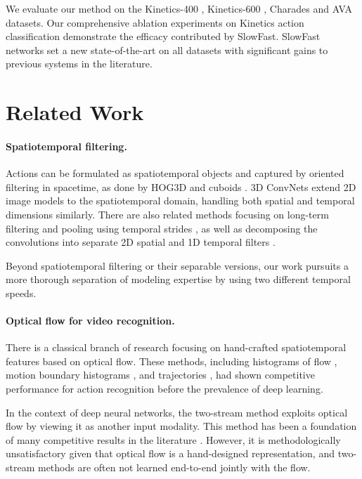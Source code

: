\documentclass[10pt,twocolumn,letterpaper]{article}
\begin{document}
	We  evaluate our method on the Kinetics-400 \cite{Kay2017}, Kinetics-600 \cite{Carreira2018}, Charades \cite{Sigurdsson2016} and AVA \cite{Gu2018} datasets. Our comprehensive ablation experiments 	on Kinetics action classification demonstrate the efficacy contributed by SlowFast.  SlowFast networks set a new state-of-the-art on all datasets with significant gains to previous systems in the literature.
	
	\section{Related Work}
	\label{sec:related_work}
	
	\paragraph{Spatiotemporal filtering.}
	Actions can be formulated as spatiotemporal objects and captured by oriented filtering in spacetime, as done by HOG3D \cite{Klaeser2008} and cuboids \cite{Dollar2005}.
	3D ConvNets \cite{Taylor2010,Tran2015,Carreira2017} extend 2D image models \cite{Krizhevsky2012,Simonyan2015,Szegedy2015,He2016} to the spatiotemporal domain, handling both spatial and temporal dimensions similarly.
	There are also related methods focusing on long-term filtering and pooling using temporal strides \cite{Varol2018,Feichtenhofer2016,Wang2016a,Zhou2017}, as well as decomposing the convolutions into separate 2D spatial and 1D temporal filters \cite{Feichtenhofer2016a,Tran2018,Xie2018,Qiu2017}.
	
	Beyond spatiotemporal filtering or their separable versions, our work pursuits a more thorough separation of modeling expertise by using two different temporal speeds.
	
	\paragraph{Optical flow for video recognition.}
	There is a classical branch of research focusing on hand-crafted spatiotemporal features based on optical flow.
	These methods, including histograms of flow \cite{Laptev2008}, motion boundary histograms \cite{Dalal2006}, and trajectories \cite{Wang2013}, had shown competitive performance for action recognition before the prevalence of deep learning.
	
	In the context of deep neural networks, the two-stream method \cite{Simonyan2014} exploits optical flow by viewing it as another input modality. This method has been a foundation of many competitive results in the literature \cite{Feichtenhofer2016a,Feichtenhofer2016,Wang2016a}.
	However, it is methodologically unsatisfactory given that optical flow is a hand-designed representation, and two-stream methods are often not learned end-to-end jointly with the flow.  
	
\end{document}

